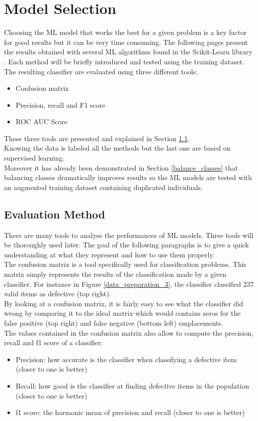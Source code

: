 \section{Model Selection}
Choosing the ML model that works the best for a given problem is a key factor
for good results but it can be very time consuming. The following pages present
the results obtained with several ML algorithms found in the Scikit-Learn library \cite{supervised_scikit}. Each method will be briefly
introduced and tested using the training dataset. The resulting classifier are
evaluated
using three different tools:
\begin{itemize}
    \item Confusion matrix
    \item Precision, recall and F1 score
    \item ROC AUC Score
\end{itemize}
These three tools are presented and explained in Section \ref{eval}.\\
Knowing the data is labeled all the methods but the last one are based on
supervised learning.\\
Moreover it has already been demonstrated in Section \ref{balance_classes} that
balancing classes dramatically improves results so the ML models are tested
with an augmented training dataset containing duplicated individuals.

\subsection{Evaluation Method}
\label{eval}
There are many tools to analyse the performances of ML models. Three tools will
be thoroughly used later. The goal of the following paragraphs is to give a
quick understanding at what they represent and how to use them properly.\\

The confusion matrix is a tool specifically used for classification problems.
This matrix simply represents the results of the classification made by a given
classifier. For instance in Figure \ref{data_preparation_3}, the classifier
classified 237 valid items as defective (top right).\\
By looking at a confusion matrix, it is fairly easy to see what the classifier
did wrong by comparing it to the ideal matrix which would contains zeros for
the false positive (top right) and false negative (bottom left) emplacements.\\

The values contained in the confusion matrix also allow to compute the
precision, recall and f1 score of a classifier:
\begin{itemize}
    \item Precision: how accurate is the classifier when classifying a
          defective item (closer to one is better)
    \item Recall: how good is the classifier at finding defective items in the
          population (closer to one is better)
    \item f1 score: the harmonic mean of precision and recall (closer to one is
          better)
\end{itemize}

